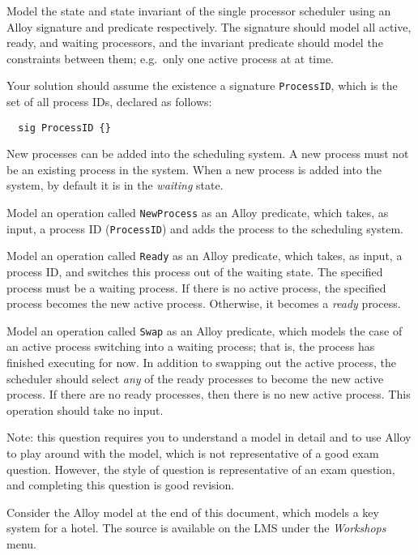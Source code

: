 
Model the state and state invariant of the single processor scheduler using an Alloy signature and predicate respectively. The signature should model all active, ready, and waiting processors, and the invariant predicate should model the constraints between them; e.g.\ only one active process at at time.

Your solution should assume the existence a signature \verb+ProcessID+, which is the set of all process IDs, declared as follows:

\begin{verbatim}
  sig ProcessID {}
\end{verbatim}


New processes can be added into the scheduling system. A new process must not be an existing process in the system. When a new process is added into the system, by default it is in the \emph{waiting} state.

Model an operation called \verb+NewProcess+ as an Alloy predicate, which takes, as input, a process ID (\verb+ProcessID+) and adds the process to the scheduling system.


Model an operation called \verb+Ready+ as an Alloy predicate, which takes, as input, a process ID, and switches this process out of the waiting state. The specified process must be a waiting process.  If there is no active process, the specified process becomes the new active process. Otherwise, it becomes a \emph{ready} process.


Model an operation called \verb+Swap+ as an Alloy predicate, which models the case of an active process switching into a waiting process; that is, the process has finished executing for now. In addition to swapping out the active process, the scheduler should select \emph{any} of the ready processes to become the new active process. If there are no ready processes, then there is no new active process. This operation should take no input.

Note: this question requires you to understand a model in detail and to use Alloy to play around with the model, which is not representative of a good exam question. However, the style of question is representative of an exam question, and completing this question is good revision.

Consider the Alloy model at the end of this document, which models a key system for a hotel. The source is available on the LMS under the \emph{Workshops} menu.

